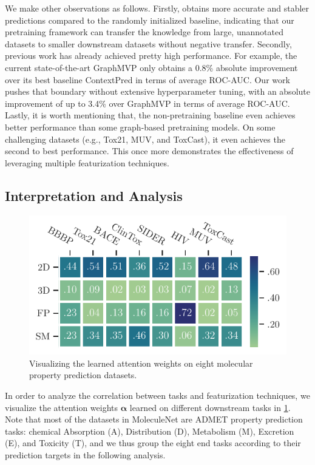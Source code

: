 We make other observations as follows.
Firstly, \themodel obtains more accurate and stabler predictions compared to the randomly initialized baseline, indicating that our pretraining framework can transfer the knowledge from large, unannotated datasets to smaller downstream datasets without negative transfer.
Secondly, previous work has already achieved pretty high performance. For example, the current state-of-the-art GraphMVP only obtains a 0.8\% absolute improvement over its best baseline ContextPred in terms of average ROC-AUC. Our work pushes that boundary without extensive hyperparameter tuning, with an absolute improvement of up to 3.4\% over GraphMVP in terms of average ROC-AUC.
Lastly, it is worth mentioning that, the non-pretraining baseline even achieves better performance than some graph-based pretraining models. On some challenging datasets (e.g., Tox21, MUV, and ToxCast), it even achieves the second to best performance. This once more demonstrates the effectiveness of leveraging multiple featurization techniques.


\subsection{Interpretation and Analysis}


\begin{figure}
	\setlength{\intextsep}{2pt}
	\centering
	\includegraphics[width=\linewidth,bb=0 0 287 156]{figures/attention.pdf}
	\caption{Visualizing the learned attention weights on eight molecular property prediction datasets.}
	\label{fig:attention}
\end{figure}
In order to analyze the correlation between tasks and featurization techniques, we visualize the attention weights \(\bm\alpha\) learned on different downstream tasks in \cref{fig:attention}.
Note that most of the datasets in MoleculeNet \cite{Wu:2018dv} are ADMET property prediction tasks: chemical Absorption (A), Distribution (D), Metabolism (M), Excretion (E), and Toxicity (T), and we thus group the eight end tasks according to their prediction targets in the following analysis.

